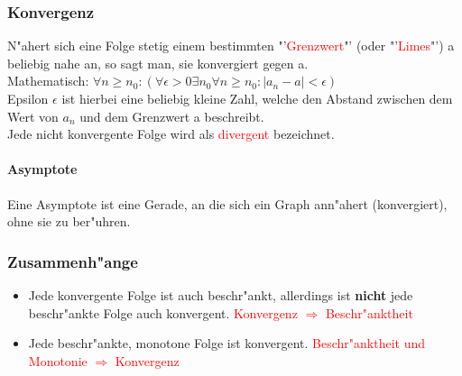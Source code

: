 \subsubsection{Konvergenz}
N"ahert sich eine Folge stetig einem bestimmten "'\textcolor{red}{Grenzwert}"' (oder "'\textcolor{red}{Limes}"') a beliebig nahe an, so sagt man, sie konvergiert gegen a.\\
Mathematisch: $\forall n \geq n_0: (\forall \epsilon>0 \exists n_0 \forall n\geq n_0 : |a_n - a|<\epsilon)$\\
Epsilon $\epsilon$ ist hierbei eine beliebig kleine Zahl, welche den Abstand zwischen dem Wert von $a_n$ und dem Grenzwert a beschreibt.\\
Jede nicht konvergente Folge wird als \textcolor{red}{divergent} bezeichnet.

\paragraph{Asymptote}
Eine Asymptote ist eine Gerade, an die sich ein Graph ann"ahert (konvergiert), ohne sie zu ber"uhren.

\subsubsection{Zusammenh"ange}
\begin{itemize}
\item Jede konvergente Folge ist auch beschr"ankt, allerdings ist \textbf{nicht} jede beschr"ankte Folge auch konvergent. \textcolor{red}{Konvergenz $\Rightarrow$ Beschr"anktheit}
\item Jede beschr"ankte, monotone Folge ist konvergent. \textcolor{red}{Beschr"anktheit und Monotonie $\Rightarrow$ Konvergenz}
\end{itemize}
